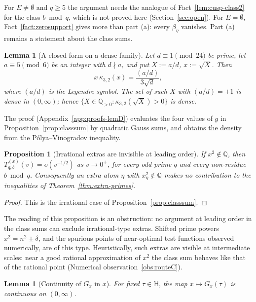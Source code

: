 \documentclass[11pt]{amsart}
\newcommand{\QQ}{\mathbb Q}
\newtheorem{proposition}[theorem]{Proposition}
\newtheorem{lemma}[theorem]{Lemma}
\theoremstyle{definition}
\theoremstyle{remark}
\numberwithin{equation}{section}
\begin{document}
For $E\ne\emptyset$ and $q\ge5$ the argument needs the analogue of Fact~\ref{lem:cusp-class2} for the class $b\bmod q$, which
is not proved here (Section~\ref{sec:open}). For $E=\emptyset$, Fact~\ref{fact:zerosupport} gives more than part (a): every $\beta_\eta$
vanishes. Part (a) remains a statement about the class sums.

\begin{lemma}[A closed form on a dense family]\label{lem:D}
Let $d\equiv1\pmod{24}$ be prime, let $a\equiv5\pmod6$ be an integer with $d\nmid a$, and put $X:=a/d$, $x:=\sqrt X$. Then
\[
x\,\kappa_{3,2}(x)=\frac{(a/d)}{3\sqrt d},
\]
where $(a/d)$ is the Legendre symbol. The set of such $X$ with $(a/d)=+1$ is dense in $(0,\infty)$; hence
$\{X\in\QQ_{>0}:\kappa_{3,2}(\sqrt X)>0\}$ is dense.
\end{lemma}

The proof (Appendix~\ref{app:proofs-lemD}) evaluates the four values of $g$ in Proposition~\ref{prop:classsum} by quadratic
Gauss sums, and obtains the density from the P\'olya--Vinogradov inequality.

\begin{proposition}[Irrational extras are invisible at leading order]\label{prop:invisible}
If $x^2\notin\QQ$, then $T^{(x)}_{q,b}(v)=o(v^{-1/2})$ as $v\to0^+$, for every odd prime $q$ and every non-residue $b\bmod q$. Consequently
an extra atom $\eta$ with $x_\eta^2\notin\QQ$ makes no contribution to the inequalities of Theorem~\ref{thm:extra-primes}.
\end{proposition}

\begin{proof}
This is the irrational case of Proposition~\ref{prop:classsum}.
\end{proof}

The reading of this proposition is an obstruction: no argument at leading order in the class sums can exclude irrational-type
extras. Shifted prime powers $x^2=n^2\pm\delta$,
and the spurious points of near-optimal test functions observed numerically, are of this type. Heuristically, such extras are
visible at intermediate scales: near a good rational approximation of $x^2$ the class sum behaves like that of the rational
point (Numerical observation~\ref{obs:routeC}).

\begin{lemma}[Continuity of $G_x$ in $x$]\label{lem:Gx-cont}
For fixed $\tau\in\mathbb H$, the map $x\mapsto G_x(\tau)$ is continuous on $(0,\infty)$.
\end{lemma}
\end{document}
